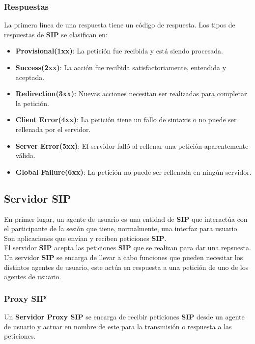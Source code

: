 \documentclass[a4paper, 11pt]{article} %
\begin{document}
		\subsubsection{Respuestas}
		La primera línea de una respuesta tiene un código de respuesta. Los tipos de respuestas de \textbf{SIP} se clasifican en:
		\begin{itemize}
			\item \textbf{Provisional(1xx)}: La petición fue recibida y está siendo  procesada.
			\item \textbf{Success(2xx)}: La acción fue recibida satisfactoriamente, entendida y aceptada.
			\item \textbf{Redirection(3xx)}: Nuevas acciones necesitan ser realizadas para completar la petición.
			\item \textbf{Client Error(4xx)}: La petición tiene un fallo de sintaxis o no puede ser rellenada por el servidor.
			\item \textbf{Server Error(5xx)}: El servidor falló al rellenar una petición aparentemente válida.
			\item \textbf{Global Failure(6xx)}: La petición no puede ser rellenada en ningún servidor.
		\end{itemize}
	
	\subsection{Servidor SIP}
		En primer lugar, un agente de usuario es una entidad de \textbf{SIP} que interactúa con el participante de la sesión que tiene, normalmente, una interfaz para usuario. Son aplicaciones que envían y reciben peticiones \textbf{SIP}.\\
		El servidor \textbf{SIP} acepta las peticiones \textbf{SIP} que se realizan para dar una repsuesta. Un servidor \textbf{SIP} se encarga de llevar a cabo funciones que pueden necesitar los distintos agentes de usuario, este actúa en respuesta a una petición de uno de los agentes de usuario.
		
		\subsubsection{Proxy SIP}
			Un \textbf{Servidor Proxy SIP} se encarga de recibir peticiones \textbf{SIP} desde un agente de usuario y actuar en nombre de este para la transmisión o respuesta a las peticiones.
		
\end{document}
